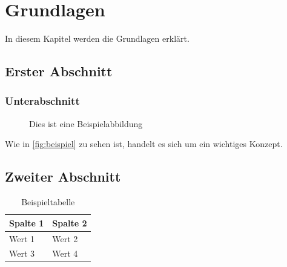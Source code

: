 
\chapter{Grundlagen}

In diesem Kapitel werden die Grundlagen erklärt.

\section{Erster Abschnitt}

\blindtext

\subsection{Unterabschnitt}

\blindtext

\begin{figure}[htbp]
	\centering
	\caption[Beispielabbildung]{Dies ist eine Beispielabbildung}
	\label{fig:beispiel}
\end{figure}

Wie in \autoref{fig:beispiel} zu sehen ist, handelt es sich um ein wichtiges Konzept.

\section{Zweiter Abschnitt}

\blindtext

\begin{table}[htbp]
	\centering
	\caption{Beispieltabelle}
	\begin{tabular}{ll}
		\toprule
		\textbf{Spalte 1} & \textbf{Spalte 2} \\
		\midrule
		Wert 1            & Wert 2            \\
		Wert 3            & Wert 4            \\
		\bottomrule
	\end{tabular}
	\label{tab:beispiel}
\end{table}

